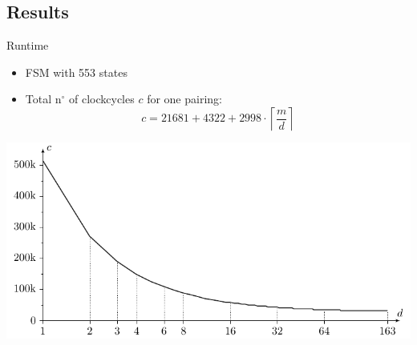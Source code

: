 \documentclass[svgnames]{beamer}
\newenvironment{changemargin}[2]{%
\begin{list}{}{%
\setlength{\topsep}{0pt}%
\setlength{\leftmargin}{#1}%
\setlength{\rightmargin}{#2}%
\setlength{\listparindent}{\parindent}%
\setlength{\itemindent}{\parindent}%
\setlength{\parsep}{\parskip}%
}%
\item[]}{\end{list}}
\begin{document}
\subsection*{Results}
\begin{frame}{Runtime}
	\begin{itemize}
		\item FSM with 553 states
		\item Total n$^{\circ}$ of clockcycles $c$ for one pairing:
				\[c = 21681 + 4322 + 2998 \cdot \left\lceil \frac{m}{d} \right\rceil\]
	\end{itemize}
	
	\begin{changemargin}{-4cm}{-4cm}
		\begin{center}\includegraphics[height=0.40\paperheight]{images/results-multi-cycles}\end{center}
	\end{changemargin}
	
	~\\[3em]
	
\vfill
\end{frame}
\end{document}
